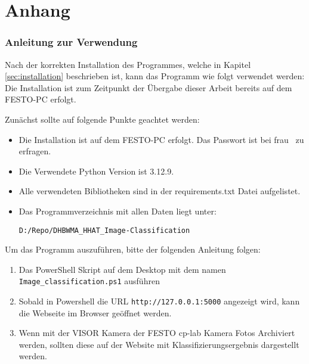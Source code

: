 \appendix
\renewcommand{\thesection}{\Alph{section}} %
\renewcommand{\thesubsection}{\thesection.\arabic{subsection}} %
\renewcommand*{\sectionmark}[1]{\markright{Anhang \thesection: #1}}

\chapter{Anhang}
	
\subsection{Anleitung zur Verwendung} \label{subsec:anleitung_zur_verwendung}

Nach der korrekten Installation des Programmes, welche in Kapitel \ref{sec:installation} beschrieben ist, kann das Programm wie folgt verwendet werden:
Die Installation ist zum Zeitpunkt der Übergabe dieser Arbeit bereits auf dem FESTO-PC erfolgt. 


Zunächst sollte auf folgende Punkte geachtet werden:
\begin{itemize}
    \item Die Installation ist auf dem FESTO-PC erfolgt. Das Passwort ist bei frau \BetreuerDHBW \ zu erfragen.
    \item Die Verwendete Python Version ist 3.12.9.
    \item Alle verwendeten Bibliotheken sind in der requirements.txt Datei aufgelistet.
    \item Das Programmverzeichnis mit allen Daten liegt unter: 
    
    \texttt{D:/Repo/DHBWMA\_HHAT\_Image-Classification}
\end{itemize}

Um das Programm auszuführen, bitte der folgenden Anleitung folgen:

\begin{enumerate}
    \item Das PowerShell Skript auf dem Desktop mit dem namen \texttt{Image\_classification.ps1} ausführen
    \item Sobald in Powershell die URL \texttt{http://127.0.0.1:5000} angezeigt wird, kann die Webseite im Browser geöffnet werden.
    \item Wenn mit der VISOR Kamera der FESTO \ac{cp-lab} Kamera Fotos Archiviert werden, sollten diese auf der Website mit Klassifizierungsergebnis dargestellt werden. 
\end{enumerate}

